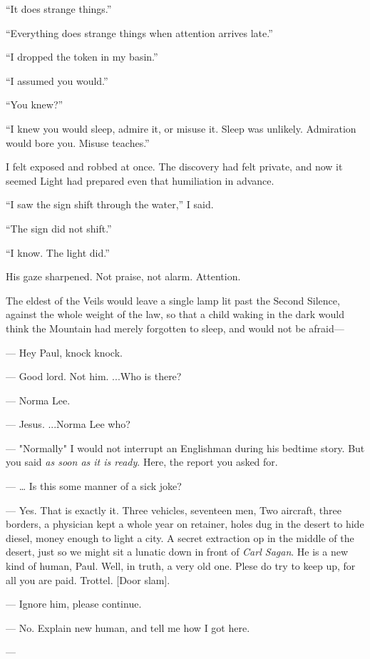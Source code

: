 ``It does strange things.''\par

``Everything does strange things when attention arrives late.''\par

``I dropped the token in my basin.''\par

``I assumed you would.''\par

``You knew?''\par

``I knew you would sleep, admire it, or misuse it. Sleep was unlikely. Admiration would bore you. Misuse teaches.''\par

I felt exposed and robbed at once. The discovery had felt private, and now it seemed Light had prepared even that humiliation in advance.\par

``I saw the sign shift through the water,'' I said.\par

``The sign did not shift.''\par

``I know. The light did.''\par

His gaze sharpened. Not praise, not alarm. Attention.\par

The eldest of the Veils would leave a single lamp lit past the Second Silence, against the whole weight of the law, so that a child waking in the dark would think the Mountain had merely forgotten to sleep, and would not be afraid---

\begin{room}

--- Hey Paul, knock knock.

--- Good lord. Not him. ...Who is there?

--- Norma Lee.

--- Jesus. ...Norma Lee who? 

--- "Normally" I would not interrupt an Englishman during his bedtime story. But you said \textit{as soon as it is ready}. Here, the report you asked for.

--- \ldots{} Is this some manner of a sick joke?

--- Yes. That is exactly it. Three vehicles, seventeen men, Two aircraft, three borders, a physician kept a whole year on retainer, holes dug in the desert to hide diesel, money enough to light a city. A secret extraction op in the middle of the desert, just so we might sit a lunatic down in front of \textit{Carl Sagan}. He is a new kind of human, Paul. Well, in truth, a very old one. Plese do try to keep up, for all you are paid. Trottel. [Door slam].

--- Ignore him, please continue.

--- No. Explain new human, and tell me how I got here.

--- 

\end{room}

